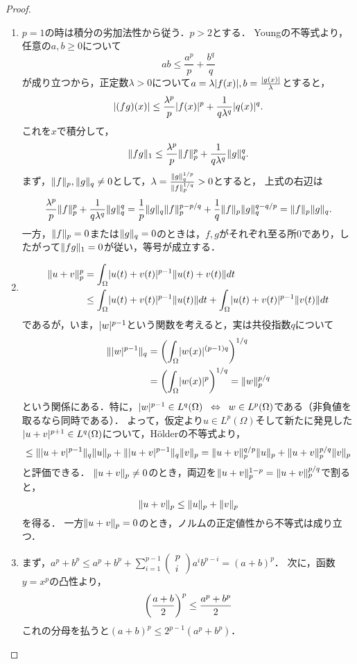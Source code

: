 \documentclass[uplatex, dvipdfmx]{jsreport}
\begin{document}
\begin{proof}\mbox{}
    \begin{enumerate}
        \item $p=1$の時は積分の劣加法性から従う．$p>2$とする．
        Youngの不等式より，任意の$a,b\ge 0$について
        \[ab\le\frac{a^p}{p}+\frac{b^q}{q}\]
        が成り立つから，正定数$\lambda>0$について$a=\lambda\lvert f(x)\rvert,b=\frac{\lvert g(x)\rvert}{\lambda}$とすると，
        \[\lvert(fg)(x)\rvert\le\frac{\lambda^p}{p}\lvert f(x)\rvert^p+\frac{1}{q\lambda^q}\lvert q(x)\rvert^q.\]
        これを$x$で積分して，
        \[\|fg\|_1\le\frac{\lambda^p}{p}\|f\|_p^p+\frac{1}{q\lambda^q}\|g\|^q_q.\]
        まず，$\|f\|_p,\|g\|_q\ne 0$として，$\lambda=\frac{\|g\|_q^{1/p}}{\|f\|_p^{1/q}}>0$とすると，
        上式の右辺は
        \[\frac{\lambda^p}{p}\|f\|_p^p+\frac{1}{q\lambda^q}\|g\|^q_q=\frac{1}{p}\|g\|_q\|f\|_p^{p-p/q}+\frac{1}{q}\|f\|_p\|g\|_q^{q-q/p}=\|f\|_p\|g\|_q.\]
        一方，$\|f\|_p=0$または$\|g\|_q=0$のときは，$f,g$がそれぞれ至る所$0$であり，したがって$\|fg\|_1=0$が従い，等号が成立する．
        \item 
        \begin{align*}
            \|u+v\|_p^p&=\int_\Omega\lvert u(t)+v(t)\rvert^{p-1}\|u(t)+v(t)\|dt\\
            &\le\int_\Omega\lvert u(t)+v(t)\rvert^{p-1}\|u(t)\|dt+\int_\Omega\lvert u(t)+v(t)\rvert^{p-1}\|v(t)\|dt\\
        \end{align*}
        であるが，いま，$\lvert w\rvert^{p-1}$という関数を考えると，実は共役指数$q$について
        \begin{align*}
            \|\lvert w\rvert^{p-1}\|_q&=\left(\int_\Omega\lvert w(x)\rvert^{(p-1)q}\right)^{1/q}\\
            &=\left(\int_\Omega\lvert w(x)\rvert^{p}\right)^{1/q}=\|w\|_p^{p/q}
        \end{align*}
        という関係にある．特に，$\lvert w\rvert^{p-1}\in L^q(\Omega)\;\;\Leftrightarrow\;\; w\in L^p(\Omega)$である（非負値を取るなら同時である）．
        よって，仮定より$u\in L^p(\Omega)$そして新たに発見した$\lvert u+v\rvert^{p+1}\in L^q(\Omega)$について，Hölderの不等式より，
        \[\le \|\lvert u+v\rvert^{p-1}\|_q\|u\|_p+\|\lvert u+v\rvert^{p-1}\|_q\|v\|_p=\|u+v\|_p^{q/p}\|u\|_p+\|u+v\|_p^{p/q}\|v\|_p\]
        と評価できる．
        $\|u+v\|_p\ne 0$のとき，両辺を$\|u+v\|_p^{1-p}=\|u+v\|_p^{p/q}$で割ると，
        \[\|u+v\|_p\le\|u\|_p+\|v\|_p\]
        を得る．
        一方$\|u+v\|_p=0$のとき，ノルムの正定値性から不等式は成り立つ．
        \item 
        まず，$a^p+b^p\le a^p+b^p+\sum_{i=1}^{p-1}\begin{pmatrix}p\\i\end{pmatrix}a^ib^{p-i}=(a+b)^p$．
        次に，函数$y=x^p$の凸性より，
        \[\left(\frac{a+b}{2}\right)^p\le\frac{a^p+b^p}{2}\]
        これの分母を払うと$(a+b)^p\le 2^{p-1}(a^p+b^p)$．
    \end{enumerate}
\end{proof}
\end{document}
